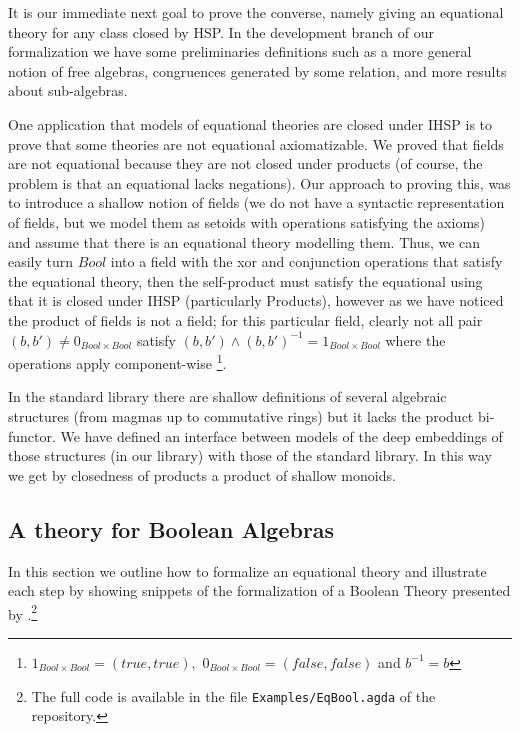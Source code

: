 
It is our immediate next goal to prove the converse, namely giving an equational
theory for any class closed by HSP. In the development branch of our
formalization we have some preliminaries definitions such as a more general
notion of free algebras, congruences generated by some relation, and more
results about sub-algebras.

One application that models of equational theories are closed under
IHSP is to prove that some theories are not equational
axiomatizable. We proved that fields are not equational because they
are not closed under products (of course, the problem is that an
equational lacks negations). Our approach to proving this, was to
introduce a shallow notion of fields (\ie we do not have a syntactic
representation of fields, but we model them as setoids with operations
satisfying the axioms) and assume that there is an equational theory
modelling them. Thus, we can easily turn $\mathit{Bool}$ into a field with
the xor and conjunction operations that satisfy the equational theory,
then the self-product must satisfy the equational using that it is closed under
IHSP (particularly Products), however as we have noticed the product of fields
is not a field; for this particular field, clearly not all pair
$(b,b') \neq 0_{\mathit{Bool} \times \mathit{Bool}}$
satisfy $(b,b') \wedge (b,b')^{-1} = 1_{\mathit{Bool} \times \mathit{Bool}}$ where
the operations apply component-wise
\footnote{$1_{\mathit{Bool} \times \mathit{Bool}} = (true, true)$,\,
  $0_{\mathit{Bool} \times \mathit{Bool}} = (false, false)$ and $b^{-1} = b$}.

In the standard library there are shallow definitions of several
algebraic structures (from magmas up to commutative rings) but it
lacks the product bi-functor. We have defined an interface between
models of the deep embeddings of those structures (in our library)
with those of the standard library. In this way we get by closedness
of products a product of shallow monoids.

\subsection{A theory for Boolean Algebras }\label{sec:eqlog-theory-ol}
In this section we outline
how to formalize an equational theory and illustrate each step by
showing snippets of the formalization of a Boolean Theory presented by
\cite{DBLP:conf/RelMiCS/RochaM08}.\footnote{The full code is available
  in the file \nolinkurl{Examples/EqBool.agda} of the repository.}

